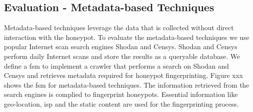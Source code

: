 \subsection{Evaluation - Metadata-based Techniques}
Metadata-based techniques leverage the data that is collected without direct interaction with the honeypot. To evaluate the metadata-based techniques we use popular Internet scan search engines Shodan and Censys. Shodan and Censys perform daily Internet scans and store the results as a queryable database. We define a \acrshort{fsm} to implement a crawler that performs a search on Shodan and Censys and retrieves metadata required for honeypot fingerprinting. Figure xxx shows the \acrshort{fsm} for metadata-based techniques. The information retrieved from the search engines is complied to fingerprint honeypots. Essential information like geo-location, \acrshort{isp} and the static content are used for the fingerprinting process. 